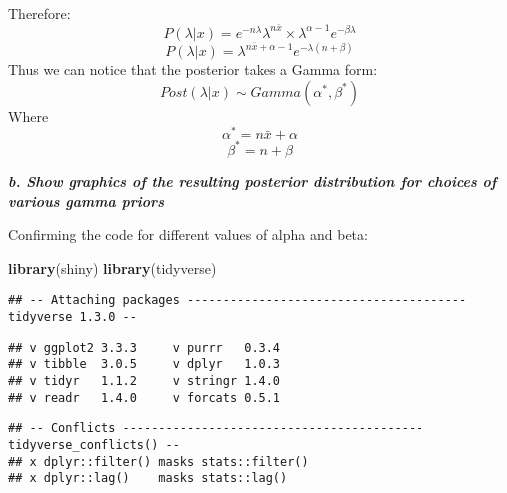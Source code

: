\documentclass[
]{article}
\newenvironment{Shaded}{\begin{snugshade}}{\end{snugshade}}
\newcommand{\KeywordTok}[1]{\textcolor[rgb]{0.13,0.29,0.53}{\textbf{#1}}}
\newcommand{\NormalTok}[1]{#1}
\begin{document}
Therefore:
\[P(\lambda|x)=e^{-n\lambda}\lambda^{n\bar x}\times\lambda^{\alpha-1}e^{-\beta\lambda}\]
\[P(\lambda|x)=\lambda^{n\bar x+\alpha-1}e^{-\lambda(n+\beta)}\] Thus we
can notice that the posterior takes a Gamma form:
\[Post(\lambda|x)∼Gamma(\alpha^*,\beta^*)\] Where
\[\alpha^*=n\bar x+\alpha \] \[\beta^*=n+\beta\]

\textbf{\emph{b. Show graphics of the resulting posterior distribution
for choices of various gamma priors}}

Confirming the code for different values of alpha and beta:

\begin{Shaded}
\begin{Highlighting}[]
\KeywordTok{library}\NormalTok{(shiny)}
\KeywordTok{library}\NormalTok{(tidyverse)}
\end{Highlighting}
\end{Shaded}

\begin{verbatim}
## -- Attaching packages --------------------------------------- tidyverse 1.3.0 --
\end{verbatim}

\begin{verbatim}
## v ggplot2 3.3.3     v purrr   0.3.4
## v tibble  3.0.5     v dplyr   1.0.3
## v tidyr   1.1.2     v stringr 1.4.0
## v readr   1.4.0     v forcats 0.5.1
\end{verbatim}

\begin{verbatim}
## -- Conflicts ------------------------------------------ tidyverse_conflicts() --
## x dplyr::filter() masks stats::filter()
## x dplyr::lag()    masks stats::lag()
\end{verbatim}
\end{document}
